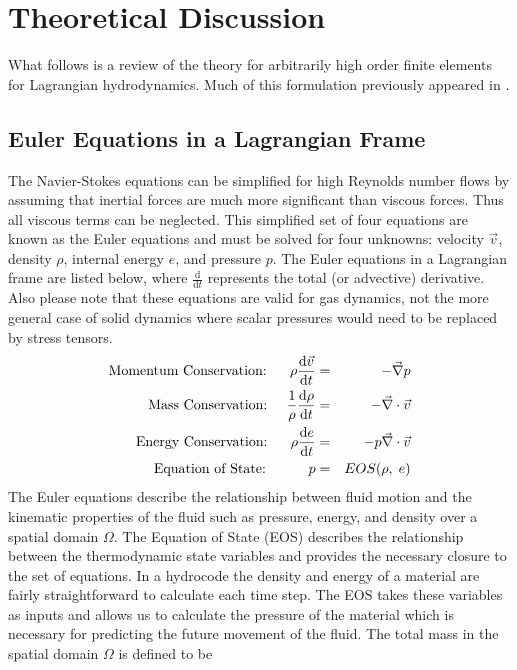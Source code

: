 
\chapter{Theoretical Discussion}\label{chap:Theory}
What follows is a review of the theory for arbitrarily high order finite elements for Lagrangian hydrodynamics. Much of this formulation previously appeared in \cite{DobrevEllisKolevRieben2010}.

\section{Euler Equations in a Lagrangian Frame}
The Navier-Stokes equations can be simplified for high Reynolds number flows by assuming that inertial forces are much more significant than viscous forces. Thus all viscous terms can be neglected. This simplified set of four equations are known as the Euler equations and must be solved for four unknowns: velocity $\vec{v}$, density $\rho$, internal energy $e$, and pressure $p$. The Euler equations in a Lagrangian frame are listed below, where $\frac{\mathrm{d}}{\mathrm{d}t}$ represents the total (or advective) derivative. Also please note that these equations are valid for gas dynamics, not the more general case of solid dynamics where scalar pressures would need to be replaced by stress tensors.
\begin{eqnarray}
  \text{Momentum Conservation:}\;\;\;\;\;\; 
  \rho \frac{\mathrm{d} \vec v}{\mathrm{d} t}        &=& 
  - \Grad p                                            
  \label{eq:MomentumConservation}                     \\
  \text{Mass Conservation:}\;\;\;\;\; 
  \frac{1}{\rho}\frac{\mathrm{d} \rho}{\mathrm{d} t} &=& 
  - \Div \vec v                                          
  \label{eq:MassConservation}                         \\
  \text{Energy Conservation:}\;\;\;\;\;\; 
  \rho \frac{\mathrm{d} e}{\mathrm{d} t}             &=& 
  - p \Div \vec v                                                            
  \label{eq:EnergyConservation}                       \\
  \text{Equation of State:}\;\;\;\;\;\;\;\;\;\;\; 
  p                                              &=& 
  EOS(\rho,\; e)                                                          
  \label{eq:EquationOfState}                        
\end{eqnarray}
The Euler equations describe the relationship between fluid motion and the kinematic properties of the fluid such as pressure, energy, and density over a spatial domain $\Omega$. The Equation of State (EOS) describes the relationship between the thermodynamic state variables and provides the necessary closure to the set of equations. In a hydrocode the density and energy of a material are fairly straightforward to calculate each time step. The EOS takes these variables as inputs and allows us to calculate the pressure of the material which is necessary for predicting the future movement of the fluid. The total mass in the spatial domain $\Omega$ is defined to be
